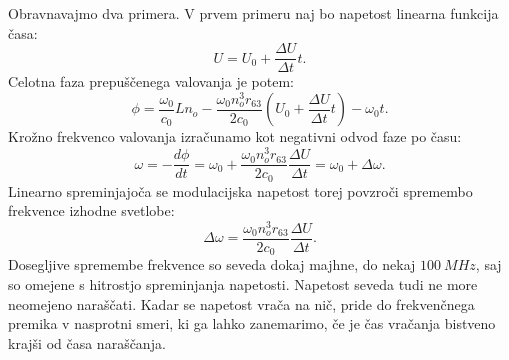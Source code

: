 Obravnavajmo dva primera. V prvem primeru naj bo 
napetost linearna funkcija časa:
\begin{equation}
U= U_0 + \frac{\Delta U}{\Delta t}t.
\end{equation}
Celotna faza prepuščenega valovanja je potem:
\begin{equation}
\phi = \frac{\omega_0}{c_0}L n_o - \frac{\omega_0 n_o^3 r_{63}}{2c_0}\left( U_0 + 
\frac{\Delta U}{\Delta t}t\right) - \omega_0 t.
\end{equation}
Krožno frekvenco valovanja izračunamo kot negativni odvod faze po času:
\begin{equation}
\omega = -\frac{d\phi}{dt} = \omega_0 + \frac{\omega_0 n_o^3 r_{63}}{2c_0}\frac{\Delta U}{\Delta t} =
\omega_0 + \Delta \omega.
\end{equation}
Linearno spreminjajoča se modulacijska napetost torej 
povzroči spremembo frekvence izhodne svetlobe:
\begin{equation}
\Delta \omega = \frac{\omega_0 n_o^3 r_{63}}{2c_0}\frac{\Delta U}{\Delta t}.
\end{equation}
Dosegljive spremembe frekvence so seveda dokaj majhne,
do nekaj $100~\si{MHz}$, saj so omejene s hitrostjo spreminjanja napetosti.
Napetost seveda tudi ne more neomejeno naraščati. Kadar se napetost
vrača na nič, pride do frekvenčnega premika v nasprotni smeri, ki  ga
lahko zanemarimo, če je čas vračanja bistveno krajši od časa naraščanja.

